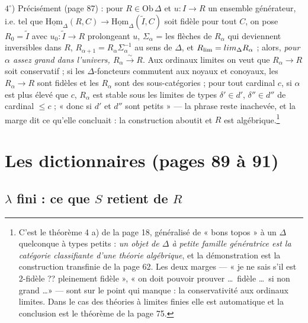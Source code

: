 \documentclass[11pt,a4paper]{article}
\begin{document}
$4^{\circ}$) Précisément (page 87) : pour $R \in \mathrm{Ob}\,\Delta$ et $u : I
\to R$ un ensemble générateur, i.e. tel que $\underline{\mathrm{Hom}}_{\Delta}
(R, C) \to \underline{\mathrm{Hom}}_{\Delta}(\widetilde{I}, C)$ soit fidèle
pour tout $C$, on pose $R_{0} = \widetilde{I}$ avec $u_{0} : \widetilde{I}
\to R$ prolongeant $u$, $\Sigma_{\alpha}$ = les flèches de $R_{\alpha}$
qui deviennent inversibles dans $R$, $R_{\alpha+1} = R_{\alpha}
\Sigma_{\alpha}^{-1}$ au sens de $\Delta$, et $R_{\lim} = \varinjlim_{\Delta}
R_{\alpha}$ ; alors, \emph{pour $\alpha$ assez grand dans l'univers,
$R_{\alpha} \xrightarrow{\sim} R$}. Aux ordinaux limites on veut que $R_{\alpha}
\to R$ soit conservatif ; si les $\Delta$-foncteurs commutent aux noyaux
et conoyaux, les $R_{\alpha} \to R$ sont fidèles et les $R_{\alpha}$ sont des
sous-catégories ; pour tout cardinal $c$, si $\alpha$ est plus élevé que
$c$, $R_{\alpha}$ est stable sous les limites de types $\delta' \in d'$,
$\delta'' \in d''$ de cardinal $\leqslant c$ ; « donc si $d'$ et $d''$ sont
petits » — la phrase reste inachevée, et la marge dit ce qu'elle
concluait : la construction aboutit et $R$ est
algébrique.\footnote{C'est le théorème 4 a) de la page 18, généralisé de
« bons topos » à un $\Delta$ quelconque à types petits : \emph{un objet de
$\Delta$ à petite famille génératrice est la catégorie classifiante d'une
théorie algébrique}, et la démonstration est la construction transfinie
de la page 62. Les deux marges — « je ne sais s'il est 2-fidèle ??
pleinement fidèle », « on doit pouvoir prouver \ldots\ fidèle \ldots\ si
non grand \ldots » — sont sur le point qui manque : la conservativité aux
ordinaux limites. Dans le cas des théories à limites finies elle est
automatique et la conclusion est le théorème de la page 75.}

\section*{Les dictionnaires (pages 89 à 91)}

\subsection*{$\lambda$ fini : ce que $S$ retient de $R$}
\end{document}
